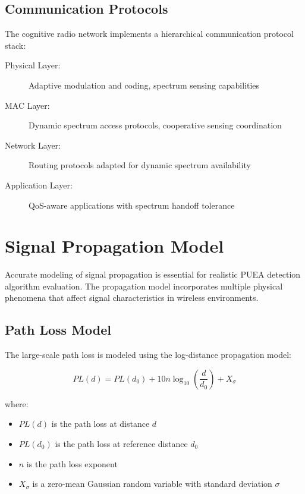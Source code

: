 
\subsection{Communication Protocols}
The cognitive radio network implements a hierarchical communication protocol stack:

\begin{description}
\item[Physical Layer:] Adaptive modulation and coding, spectrum sensing capabilities
\item[MAC Layer:] Dynamic spectrum access protocols, cooperative sensing coordination
\item[Network Layer:] Routing protocols adapted for dynamic spectrum availability
\item[Application Layer:] QoS-aware applications with spectrum handoff tolerance
\end{description}

\section{Signal Propagation Model}
Accurate modeling of signal propagation is essential for realistic PUEA detection algorithm evaluation. The propagation model incorporates multiple physical phenomena that affect signal characteristics in wireless environments.

\subsection{Path Loss Model}
The large-scale path loss is modeled using the log-distance propagation model:

\begin{equation}
PL(d) = PL(d_0) + 10n \log_{10}\left(\frac{d}{d_0}\right) + X_\sigma
\end{equation}

where:
\begin{itemize}
\item $PL(d)$ is the path loss at distance $d$
\item $PL(d_0)$ is the path loss at reference distance $d_0$
\item $n$ is the path loss exponent
\item $X_\sigma$ is a zero-mean Gaussian random variable with standard deviation $\sigma$
\end{itemize}

